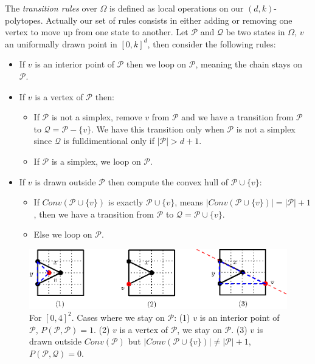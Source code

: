 \documentclass[a4paper]{article}
\newcommand{\p}{\mathcal{P}}
\newcommand{\q}{\mathcal{Q}}
\begin{document}
The \textit{transition rules} over $\Omega$ is defined as local operations on our $(d,k)$-polytopes. Actually our set of rules consists in either adding or removing one vertex to move up from one state to another. Let $\p$ and $\q$ be two states in $\Omega$, $v$ an uniformally drawn point in $[0,k]^d$, then consider the following rules:

\begin{itemize}
  \item If $v$ is an interior point of $\p$ then we loop on $\p$, meaning the chain stays on $\p$.
  \item If $v$ is a vertex of $\p$ then:
  \begin{itemize}
    \item If $\p$ is not a simplex, remove $v$ from $\p$ and we have a transition from $\p$ to $\q=\p - \{v\}$. We have this transition only when $\p$ is not a simplex since $\q$ is fulldimentional only if $|\p|>d+1$.
    \item If $\p$ is a simplex, we loop on $\p$.
  \end{itemize}
  \item If $v$ is drawn outside $\p$ then compute the convex hull of $\p \cup \{v\}$:
  \begin{itemize}
    \item If $Conv(\p\cup\{v\})$ is exactly $\p\cup\{v\}$, means $|Conv(\p \cup \{v\})| = |\p| + 1$, then we have a transition from $\p$ to $\q = \p \cup \{v\}$.
    \item Else we loop on $\p$.
  \end{itemize}
\end{itemize}


\begin{figure}
  \begin{center}
    \includegraphics[scale=0.9]{assets/boucle}
    \caption{For $[0,4]^2$. Cases where we stay on $\p$: (1) $v$ is an interior point of $\p$, $P(\p,\p) = 1$. (2) $v$ is a vertex of $\p$, we stay on $\p$. (3) $v$ is drawn outside $Conv(\p)$ but $|Conv(\p\cup\{v\})| \neq |\p|+1$, $P(\p,\q) = 0$. }
    \label{fig:boucle}
  \end{center}
\end{figure}
\end{document}
